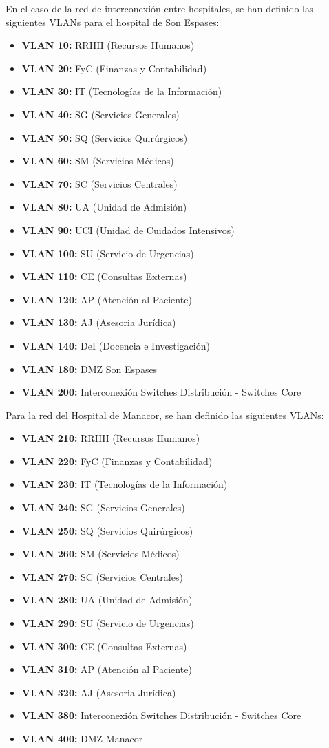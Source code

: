 En el caso de la red de interconexión entre hospitales, se han definido las siguientes VLANs para el hospital de Son Espases:
\begin{itemize}
    \item \textbf{VLAN 10:} RRHH (Recursos Humanos)
    \item \textbf{VLAN 20:} FyC (Finanzas y Contabilidad)
    \item \textbf{VLAN 30:} IT (Tecnologías de la Información)
    \item \textbf{VLAN 40:} SG (Servicios Generales)
    \item \textbf{VLAN 50:} SQ (Servicios Quirúrgicos)
    \item \textbf{VLAN 60:} SM (Servicios Médicos)
    \item \textbf{VLAN 70:} SC (Servicios Centrales)
    \item \textbf{VLAN 80:} UA (Unidad de Admisión)
    \item \textbf{VLAN 90:} UCI (Unidad de Cuidados Intensivos)
    \item \textbf{VLAN 100:} SU (Servicio de Urgencias)
    \item \textbf{VLAN 110:} CE (Consultas Externas)
    \item \textbf{VLAN 120:} AP (Atención al Paciente)
    \item \textbf{VLAN 130:} AJ (Asesoria Jurídica)
    \item \textbf{VLAN 140:} DeI (Docencia e Investigación)
    \item \textbf{VLAN 180:} DMZ Son Espases
    \item \textbf{VLAN 200:} Interconexión Switches Distribución - Switches Core
\end{itemize}

Para la red del Hospital de Manacor, se han definido las siguientes VLANs:
\begin{itemize}
    \item \textbf{VLAN 210:} RRHH (Recursos Humanos)
    \item \textbf{VLAN 220:} FyC (Finanzas y Contabilidad)
    \item \textbf{VLAN 230:} IT (Tecnologías de la Información)
    \item \textbf{VLAN 240:} SG (Servicios Generales)
    \item \textbf{VLAN 250:} SQ (Servicios Quirúrgicos)
    \item \textbf{VLAN 260:} SM (Servicios Médicos)
    \item \textbf{VLAN 270:} SC (Servicios Centrales)
    \item \textbf{VLAN 280:} UA (Unidad de Admisión)
    \item \textbf{VLAN 290:} SU (Servicio de Urgencias)
    \item \textbf{VLAN 300:} CE (Consultas Externas)
    \item \textbf{VLAN 310:} AP (Atención al Paciente)
    \item \textbf{VLAN 320:} AJ (Asesoria Jurídica)
    \item \textbf{VLAN 380:} Interconexión Switches Distribución - Switches Core
    \item \textbf{VLAN 400:} DMZ Manacor
\end{itemize}

